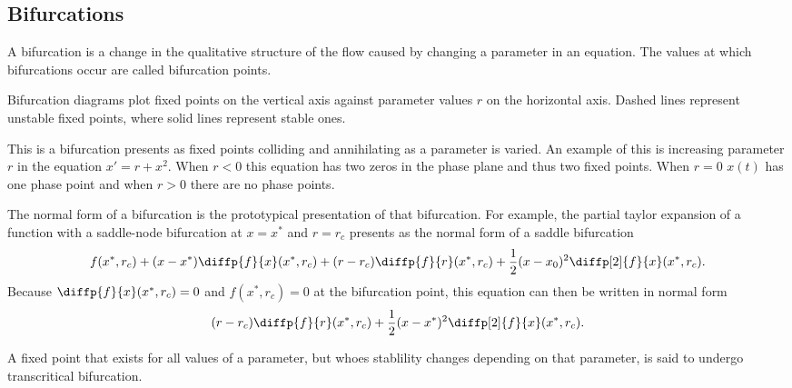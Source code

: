 \documentclass{article}
\begin{document}
\subsection{Bifurcations}
\begin{definition}[Bifurcation]
	A bifurcation is a change in the qualitative structure of the flow caused by changing a parameter in an equation. The values at which bifurcations occur are called bifurcation points.
\end{definition}
\begin{remark}
	Bifurcation diagrams plot fixed points on the vertical axis against parameter values \(r\) on the horizontal axis. Dashed lines represent unstable fixed points, where solid lines represent stable ones.
\end{remark}
\begin{definition}
	This is a bifurcation presents as fixed points colliding and annihilating as a parameter is varied. An example of this is increasing parameter \(r\) in the equation \(x'=r+x^2\). When \(r<0\) this equation has two zeros in the phase plane and thus two fixed points. When \(r=0\) \(x(t)\) has one phase point and when \(r>0\) there are no phase points.
\end{definition}
\clearpage
\begin{definition}
	The normal form of a bifurcation is the prototypical presentation of that bifurcation. For example, the partial taylor expansion of a function with a saddle-node bifurcation at \(x=x^*\) and \(r=r_c\) presents as the normal form of a saddle bifurcation
	\begin{equation*}
		f(x^*,r_c)+(x-x^*)\diffp{f}{x}(x^*,r_c)+(r-r_c)\diffp{f}{r}(x^*,r_c)+\frac{1}{2}(x-x_0)^2\diffp[2]{f}{x}(x^*,r_c).
	\end{equation*}
	Because \(\diffp{f}{x}(x^*,r_c)=0\) and \(f(x^*,r_c)=0\) at the bifurcation point, this equation can then be written in normal form
	\begin{equation*}
		(r-r_c)\diffp{f}{r}(x^*,r_c)+\frac{1}{2}(x-x^*)^2\diffp[2]{f}{x}(x^*,r_c).
	\end{equation*}
\end{definition}
\begin{definition}
	A fixed point that exists for all values of a parameter, but whoes stablility changes depending on that parameter, is said to undergo transcritical bifurcation.
\end{definition}
\end{document}
